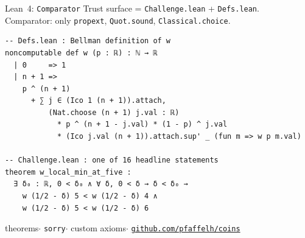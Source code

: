 \documentclass[11pt,aspectratio=169]{beamer}
\begin{document}
\begin{frame}[fragile]{Lean~4: \texttt{Comparator}}
  Trust surface = \texttt{Challenge.lean} + \texttt{Defs.lean}.\\
  Comparator: only \texttt{propext}, \texttt{Quot.sound},
  \texttt{Classical.choice}.

  \medskip
  \begin{verbatim}
-- Defs.lean : Bellman definition of w
noncomputable def w (p : ℝ) : ℕ → ℝ
  | 0     => 1
  | n + 1 =>
    p ^ (n + 1)
      + ∑ j ∈ (Ico 1 (n + 1)).attach,
          (Nat.choose (n + 1) j.val : ℝ)
            * p ^ (n + 1 - j.val) * (1 - p) ^ j.val
            * (Ico j.val (n + 1)).attach.sup' _ (fun m => w p m.val)

-- Challenge.lean : one of 16 headline statements
theorem w_local_min_at_five :
  ∃ δ₀ : ℝ, 0 < δ₀ ∧ ∀ δ, 0 < δ → δ < δ₀ →
    w (1/2 - δ) 5 < w (1/2 - δ) 4 ∧
    w (1/2 - δ) 5 < w (1/2 - δ) 6
  \end{verbatim}

   theorems\enspace$\cdot$ \texttt{sorry}\enspace$\cdot$ custom axioms\enspace$\cdot$\enspace
  \href{https://github.com/pfaffelh/coins}{\texttt{github.com/pfaffelh/coins}}
\end{frame}
\end{document}
